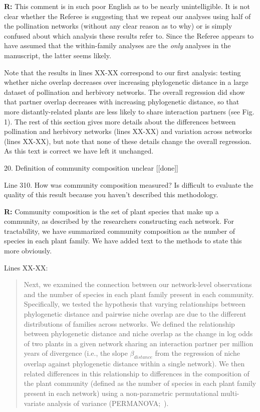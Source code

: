 \documentclass[12pt]{letter}
\newenvironment{refquote}{\bigskip \begin{it}}{\end{it}\smallskip}
\begin{document}
		\textbf{R:} This comment is in such poor English as to be nearly unintelligible. It is not clear whether the Referee is suggesting that we repeat our analyses using half of the pollination networks (without any clear reason as to why) or is simply confused about which analysis these results refer to. Since the Referee appears to have assumed that the within-family analyses are the \emph{only} analyses in the manuscript, the latter seems likely.


		Note that the results in lines XX-XX correspond to our first analysis: testing whether niche overlap decreases over increasing phylogenetic
		distance in a large dataset of pollination and herbivory networks. The overall regression did show that partner overlap decreases with increasing phylogenetic distance, so that more distantly-related plants are less likely to share interaction partners (see Fig. 1). The rest of this section gives more details about the differences between pollination and herbivory networks (lines XX-XX) and variation across networks (lines XX-XX), but note that none of these details change the overall regression. As this text is correct we have left it unchanged.


	20. Definition of community composition unclear [[done]]


		\begin{refquote}
			Line 310. How was community composition measured? Is difficult to evaluate the quality of this result because you haven't described this methodology.
		\end{refquote}


		\textbf{R:} Community composition is the set of plant species that make up a community, as described by the researchers constructing each network. For tractability, we have summarized community composition as the number of species in each plant family. We have added text to the methods to state this more obviously.


		Lines XX-XX:


		\begin{quotation}
			Next, we examined the connection between our network-level observations
		    and the number of species in each plant family present in each community.
		    Specifically, we tested the hypothesis that
		    varying relationships between phylogenetic distance and
		    pairwise niche overlap are due to the different distributions 
		    of families across networks. We defined the relationship between
		    phylogenetic distance and niche overlap as the change in 
		    log odds of two plants in a given network sharing an interaction 
		    partner per million years of divergence (i.e., the slope $\beta_{distance}$ from the 
		    regression of niche overlap against phylogenetic distance within
		    a single network). We then related differences in this relationship
		    to differences in the composition of the plant community (defined as the number of species in each plant family present in each network) using a non-parametric permutational multi-variate 
		    analysis of variance (PERMANOVA;~\citealp{Anderson2001}).
	    \end{quotation}
\end{document}
